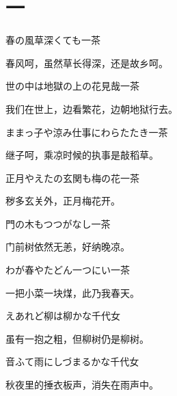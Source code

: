 
\newpage

\chapter{\FK 一}
\setcounter{haikucounter}{0}

\begin{haiku}
    {\FH 春の風草深くても}\hfill{\FH 一茶}

    {\FK 春风呵，虽然草长得深，还是故乡呵。}
\end{haiku}

\begin{haiku}
    {\FH 世の中は地獄の上の花見哉}\hfill{\FH 一茶}

    {\FK 我们在世上，边看繁花，边朝地狱行去。}
\end{haiku}

\begin{haiku}
    {\FH ままっ子や涼み仕事にわらたたき}\hfill{\FH 一茶}

    {\FK 继子呵，乘凉时候的执事是敲稻草。}
\end{haiku}

\begin{haiku}
    {\FH 正月やえたの玄関も梅の花}\hfill{\FH 一茶}

    {\FK 秽多玄关外，正月梅花开。}
\end{haiku}

\begin{haiku}
    {\FH 門の木もつつがなし}\hfill{\FH 一茶}

    {\FK 门前树依然无恙，好纳晚凉。}
\end{haiku}

\begin{haiku}
    {\FH わが春やたどん一つにい}\hfill{\FH 一茶}

    {\FK 一把小菜一块煤，此乃我春天。}
\end{haiku}

\begin{haiku}
    {\FH {}えあれど柳は柳かな}\hfill{\FH 千代女}

    {\FK 虽有一抱之粗，但柳树仍是柳树。}
\end{haiku}

\begin{haiku}
    {\FH 音ふて雨にしづまるかな}\hfill{\FH 千代女}

    {\FK 秋夜里的捶衣板声，消失在雨声中。}
\end{haiku}

